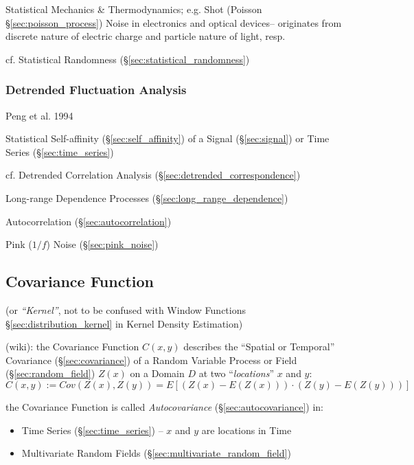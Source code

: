 Statistical Mechanics \& Thermodynamics; e.g. Shot (Poisson
\S\ref{sec:poisson_process}) Noise in electronics and optical devices--
originates from discrete nature of electric charge and particle nature of light,
resp.

cf. Statistical Randomness (\S\ref{sec:statistical_randomness})



\subsubsection{Detrended Fluctuation Analysis}\label{sec:detrended_fluctuation}

Peng et al. 1994

Statistical Self-affinity (\S\ref{sec:self_affinity}) of a Signal
(\S\ref{sec:signal}) or Time Series (\S\ref{sec:time_series})

\fist cf. Detrended Correlation Analysis (\S\ref{sec:detrended_correspondence})

Long-range Dependence Processes (\S\ref{sec:long_range_dependence})

Autocorrelation (\S\ref{sec:autocorrelation})

Pink ($1/f$) Noise (\S\ref{sec:pink_noise})



\subsection{Covariance Function}\label{sec:covariance_function}\hfill

(or \emph{``Kernel''}, not to be confused with Window Functions
\S\ref{sec:distribution_kernel} in Kernel Density Estimation)

(wiki): the Covariance Function $C(x, y)$ describes the ``Spatial or Temporal''
Covariance (\S\ref{sec:covariance}) of a Random Variable Process or Field
(\S\ref{sec:random_field}) $Z(x)$ on a Domain $D$ at two ``\emph{locations}''
$x$ and $y$:
\[
  C(x, y) := Cov(Z(x), Z(y)) = E[(Z(x) - E(Z(x))) \cdot (Z(y) - E(Z(y)))]
\]

the Covariance Function is called \emph{Autocovariance}
(\S\ref{sec:autocovariance}) in:
\begin{itemize}
  \item Time Series (\S\ref{sec:time_series}) -- $x$ and $y$ are locations in
    Time
  \item Multivariate Random Fields (\S\ref{sec:multivariate_random_field})
\end{itemize}


